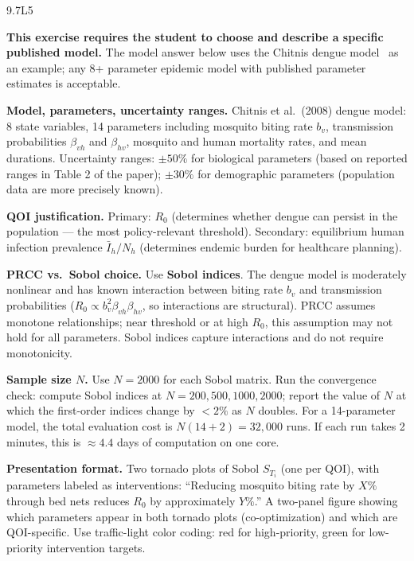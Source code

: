 \begin{solution}{9.7}{L5}

\solanswer

\textbf{This exercise requires the student to choose and describe a specific
published model.} The model answer below uses the Chitnis dengue model~\cite{chitnis2008determining}
as an example; any 8+ parameter epidemic model with published parameter estimates is acceptable.

 \textbf{Model, parameters, uncertainty ranges.}
Chitnis et al.\ (2008) dengue model: 8 state variables, 14 parameters including
mosquito biting rate $b_v$, transmission probabilities $\beta_{vh}$ and $\beta_{hv}$,
mosquito and human mortality rates, and mean durations. Uncertainty ranges:
$\pm50\%$ for biological parameters (based on reported ranges in Table 2 of the paper);
$\pm30\%$ for demographic parameters (population data are more precisely known).

 \textbf{QOI justification.}
Primary: $R_0$ (determines whether dengue can persist in the population —
the most policy-relevant threshold). Secondary: equilibrium human infection
prevalence $\bar{I}_h/N_h$ (determines endemic burden for healthcare planning).

 \textbf{PRCC vs.\ Sobol choice.}
Use \textbf{Sobol indices}. The dengue model is moderately nonlinear and
has known interaction between biting rate $b_v$ and transmission probabilities
($R_0 \propto b_v^2\beta_{vh}\beta_{hv}$, so interactions are structural).
PRCC assumes monotone relationships; near threshold or at high $R_0$,
this assumption may not hold for all parameters. Sobol indices capture
interactions and do not require monotonicity.

 \textbf{Sample size $N$.}
Use $N = 2000$ for each Sobol matrix. Run the convergence check:
compute Sobol indices at $N = 200, 500, 1000, 2000$; report the
value of $N$ at which the first-order indices change by $< 2\%$ as $N$ doubles.
For a 14-parameter model, the total evaluation cost is $N(14+2) = 32{,}000$ runs.
If each run takes 2 minutes, this is $\approx 4.4$ days of computation on one core.

 \textbf{Presentation format.}
Two tornado plots of Sobol $S_{T_i}$ (one per QOI), with parameters
labeled as interventions: ``Reducing mosquito biting rate by $X\%$ through
bed nets reduces $R_0$ by approximately $Y\%$.'' A two-panel figure
showing which parameters appear in both tornado plots (co-optimization)
and which are QOI-specific. Use traffic-light color coding: red for
high-priority, green for low-priority intervention targets.


\end{solution}
